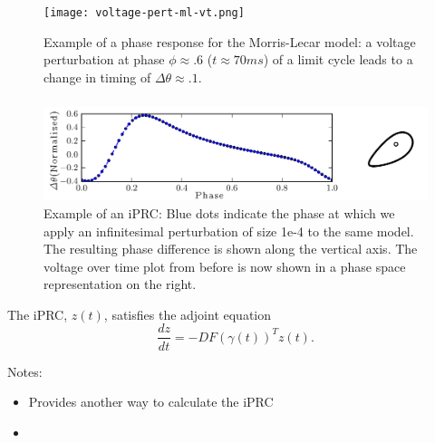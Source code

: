 \documentclass{beamer}
\begin{document}
  \begin{frame}
 \frametitle{\insertsection}
    	\framesubtitle{\insertsubsection}
    \begin{figure}
\texttt{[image: voltage-pert-ml-vt.png]}
\caption{Example of a phase response for the Morris-Lecar model: a voltage perturbation at phase $\phi \approx .6$ ($t \approx 70ms$) of a limit cycle leads to a change in timing of $\Delta \theta \approx .1$.  }
\end{figure}
  \end{frame}

  \begin{frame}
 \frametitle{\insertsection}
    	\framesubtitle{\insertsubsection}
    \begin{figure}
\includegraphics[width=1\textwidth]{voltage-pert-ml-quarter.png}
\caption{Example of an iPRC: Blue dots indicate the phase at which we apply an infinitesimal perturbation of size 1e-4 to the same model. The resulting phase difference is shown along the vertical axis.  The voltage over time plot from before is now shown in a phase space representation on the right.}
\end{figure}
  \end{frame}



\begin{frame}
 The iPRC, $z(t)$, satisfies the adjoint equation
\begin{equation}
 \frac{dz}{dt} = -DF(\gamma(t))^T z(t).
\end{equation}

Notes:
\begin{itemize}
 \item Provides another way to calculate the iPRC
 \item 
\end{itemize}


\end{frame}
\end{document}
